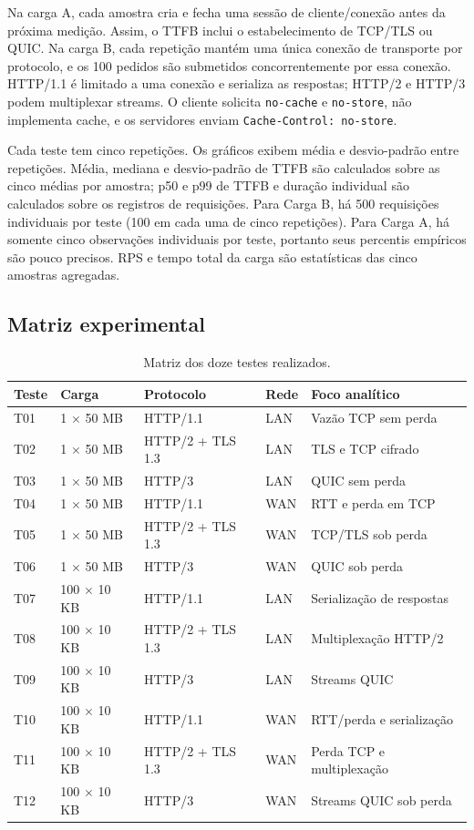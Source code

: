 \documentclass[12pt,a4paper]{article}
\begin{document}
Na carga A, cada amostra cria e fecha uma sessão de cliente/conexão antes da próxima medição.
Assim, o TTFB inclui o estabelecimento de TCP/TLS ou QUIC. Na carga B, cada repetição mantém
uma única conexão de transporte por protocolo, e os 100 pedidos são submetidos
concorrentemente por essa conexão. HTTP/1.1 é limitado a uma conexão e serializa as respostas;
HTTP/2 e HTTP/3 podem multiplexar streams. O cliente solicita \texttt{no-cache} e
\texttt{no-store}, não implementa cache, e os servidores enviam \texttt{Cache-Control:
no-store}.

Cada teste tem cinco repetições. Os gráficos exibem média e desvio-padrão entre repetições.
Média, mediana e desvio-padrão de TTFB são calculados sobre as cinco médias por amostra;
p50 e p99 de TTFB e duração individual são calculados sobre os registros de requisições.
Para Carga B, há 500 requisições individuais por teste (100 em cada uma de cinco repetições).
Para Carga A, há somente cinco observações individuais por teste, portanto seus percentis
empíricos são pouco precisos. RPS e tempo total da carga são estatísticas das cinco amostras
agregadas.

\subsection{Matriz experimental}

\begin{table}[H]
\centering
\small
\caption{Matriz dos doze testes realizados.}
\begin{tabularx}{\textwidth}{@{}l l l l X@{}}
\toprule
Teste & Carga & Protocolo & Rede & Foco analítico\\
\midrule
T01 & 1 $\times$ 50 MB & HTTP/1.1 & LAN & Vazão TCP sem perda\\
T02 & 1 $\times$ 50 MB & HTTP/2 + TLS 1.3 & LAN & TLS e TCP cifrado\\
T03 & 1 $\times$ 50 MB & HTTP/3 & LAN & QUIC sem perda\\
T04 & 1 $\times$ 50 MB & HTTP/1.1 & WAN & RTT e perda em TCP\\
T05 & 1 $\times$ 50 MB & HTTP/2 + TLS 1.3 & WAN & TCP/TLS sob perda\\
T06 & 1 $\times$ 50 MB & HTTP/3 & WAN & QUIC sob perda\\
T07 & 100 $\times$ 10 KB & HTTP/1.1 & LAN & Serialização de respostas\\
T08 & 100 $\times$ 10 KB & HTTP/2 + TLS 1.3 & LAN & Multiplexação HTTP/2\\
T09 & 100 $\times$ 10 KB & HTTP/3 & LAN & Streams QUIC\\
T10 & 100 $\times$ 10 KB & HTTP/1.1 & WAN & RTT/perda e serialização\\
T11 & 100 $\times$ 10 KB & HTTP/2 + TLS 1.3 & WAN & Perda TCP e multiplexação\\
T12 & 100 $\times$ 10 KB & HTTP/3 & WAN & Streams QUIC sob perda\\
\bottomrule
\end{tabularx}
\end{table}
\end{document}
